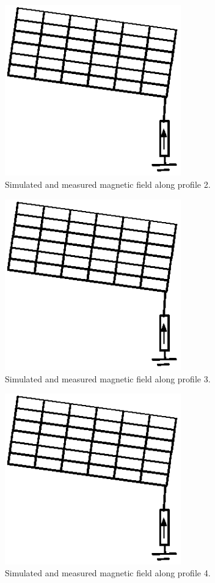 \documentclass[journal]{../template/IEEEtran}
\begin{document}
\begin{figure}[ht]
	\centering
		\includegraphics[width=3in]{../resources/image.eps}
		\caption{Simulated and measured magnetic field along profile 2.}
	\label{fig:slice2}
\end{figure}

\begin{figure}[ht]
	\centering
		\includegraphics[width=3in]{../resources/image.eps}
		\caption{Simulated and measured magnetic field along profile 3.}
	\label{fig:slice3}
\end{figure}

\begin{figure}[htt]
	\centering
		\includegraphics[width=3in]{../resources/image.eps}
		\caption{Simulated and measured magnetic field along profile 4.}
	\label{fig:slice4}
\end{figure}
\end{document}

